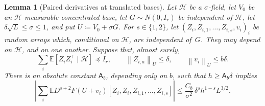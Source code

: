 \documentclass[11pt,letterpaper]{article}
\newtheorem{lemma}{Lemma}
\theoremstyle{remark}
\newcommand{\E}{\mathbb E}
\newcommand{\norm}[1]{\left\lVert#1\right\rVert}
\begin{document}
\begin{lemma}[Paired derivatives at translated bases]
\label{appx-an:lem:restoration}
Let \(\mathcal H\) be a \(\sigma\)-field, let \(V_0\) be an
\(\mathcal H\)-measurable concentrated base, let \(G\sim N(0,I_r)\) be
independent of \(\mathcal H\), let \(\delta\sqrt L\le\sigma\le1\), and put
\(U\coloneqq V_0+\sigma G\). For \(s\in\{1,2\}\), let
\((Z_i,Z_{i,1},\ldots,Z_{i,s},v_i)_i\) be random arrays which, conditional
on \(\mathcal H\), are independent of~\(G\). They may depend on
\(\mathcal H\), and on one another. Suppose that, almost surely,
\begin{equation}
 \sum_i\E[Z_iZ_i^\top\mid\mathcal H]\preceq I_r,
 \qquad \norm{Z_{i,a}}_U\le\delta,
 \qquad \norm{v_i}_U\le b\delta.
 \label{appx-an:conditional-budget}
\end{equation}
There is an absolute constant \(\mathsf A_b\), depending only on \(b\),
such that \(h\ge\mathsf A_b\delta\) implies
\begin{equation}
 \left|\sum_i\E D^{s+2}F(U+v_i)
         [Z_i,Z_i,Z_{i,1},\ldots,Z_{i,s}]\right|
 \le\frac{C_b}{\sigma^2}\,
                 \delta^s h^{1-s}L^{3/2}.
 \label{appx-an:restoration-bound}
\end{equation}
\end{lemma}
\end{document}
